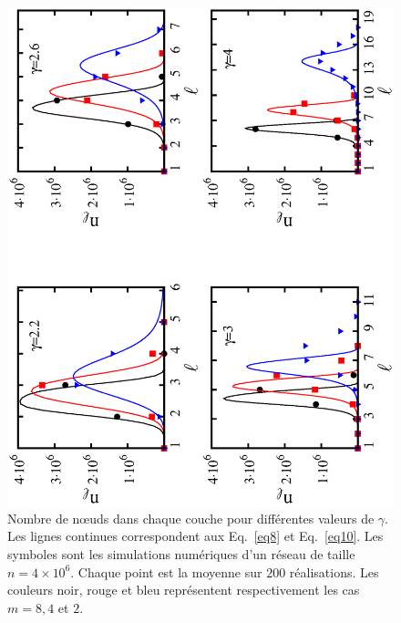 \begin{figure}[h!]
	\centering
	\includegraphics[angle=-90,scale=0.65]{./figures/fig2-3}
	\caption{Nombre de nœuds dans chaque couche pour différentes valeurs de $ \gamma $. Les lignes continues correspondent aux Eq.~\eqref {eq8} et Eq.~\eqref{eq10}. Les symboles sont les simulations numériques d'un réseau de taille $n=4\times10^6$.  Chaque point est la moyenne sur $200$ réalisations. Les couleurs noir, rouge et bleu représentent respectivement les cas $ m = 8, 4 $ et $ 2 $.}
	\label{fig2-3}
\end{figure}

